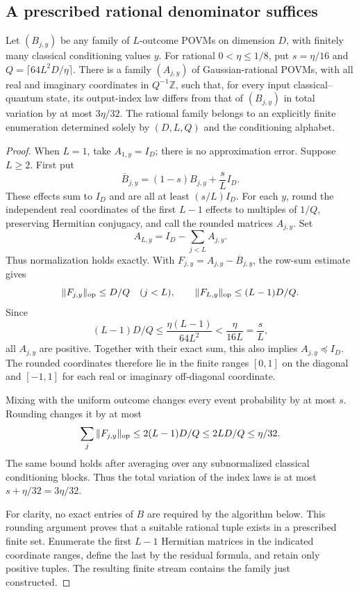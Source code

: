 \subsection{A prescribed rational denominator suffices}
\begin{proposition}
\label{prop:rationalreadout81}
Let $(B_{j,y})$ be any family of $L$-outcome POVMs on dimension $D$,
with finitely many classical conditioning values $y$.  For rational
$0<\eta\le1/8$, put
$s=\eta/16$ and $Q=\lceil64L^2D/\eta\rceil$.
There is a family $(A_{j,y})$ of Gaussian-rational POVMs, with all real and imaginary
coordinates in $Q^{-1}\mathbb Z$, such that, for every input
classical--quantum state, its output-index law differs from that of
$(B_{j,y})$ in total variation by at most $3\eta/32$.
The rational family belongs to an explicitly finite enumeration
determined solely by $(D,L,Q)$ and the conditioning alphabet.
\end{proposition}
\begin{proof}
When $L=1$, take $A_{1,y}=I_D$; there is no approximation error.
Suppose $L\ge2$.  First put
\[
 \overline B_{j,y}=(1-s)B_{j,y}+\frac{s}{L}I_D.
\]
These effects sum to $I_D$ and are all at least $(s/L)I_D$.
For each $y$, round the independent real coordinates of the first
$L-1$ effects to multiples of $1/Q$, preserving Hermitian conjugacy,
and call the rounded matrices $A_{j,y}$.  Set
\[
 A_{L,y}=I_D-\sum_{j<L}A_{j,y}.
\]
Thus normalization holds exactly.  With
$F_{j,y}=A_{j,y}-\overline B_{j,y}$, the row-sum estimate gives
\[
 \|F_{j,y}\|_{\rm op}\le D/Q\quad(j<L),\qquad
 \|F_{L,y}\|_{\rm op}\le(L-1)D/Q.
\]
Since
\[
 (L-1)D/Q\le\frac{\eta(L-1)}{64L^2}
              <\frac{\eta}{16L}=\frac{s}{L},
\]
all $A_{j,y}$ are positive.  Together with their exact sum, this
also implies $A_{j,y}\preceq I_D$.  The rounded coordinates therefore
lie in the finite ranges $[0,1]$ on the diagonal and $[-1,1]$ for
each real or imaginary off-diagonal coordinate.

Mixing with the uniform outcome changes every event probability by
at most $s$.  Rounding changes it by at most
\[
 \sum_j\|F_{j,y}\|_{\rm op}
 \le2(L-1)D/Q\le2LD/Q\le\eta/32.
\]
The same bound holds after averaging over any subnormalized
classical conditioning blocks.  Thus the total variation of the
index laws is at most $s+\eta/32=3\eta/32$.

For clarity, no exact entries of $B$ are required by the algorithm
below.  This rounding argument proves that a suitable rational tuple
exists in a prescribed finite set.  Enumerate the first $L-1$
Hermitian matrices in the indicated coordinate ranges, define the
last by the residual formula, and retain only positive tuples.
The resulting finite stream contains the family just constructed.
\end{proof}

